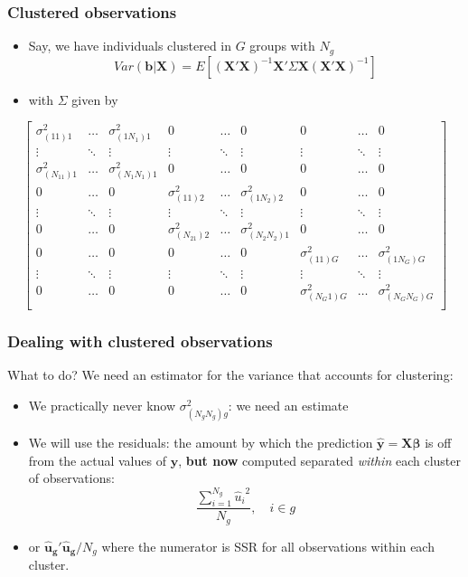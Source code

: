 \documentclass[xcolor=table,dvipsnames]{beamer}
\begin{document}
\begin{frame}
\frametitle{Clustered observations}
\begin{itemize}
\item Say, we have individuals clustered in $G$ groups with $N_g$ \pause
\[ Var(\mathbf{b}|\mathbf{X}) = E \left[(\mathbf{X}'\mathbf{X})^{-1}\mathbf{X}'\Sigma\mathbf{X}(\mathbf{X}'\mathbf{X})^{-1}\right]
\]
\item with $\Sigma$ given by
\end{itemize}
\footnotesize
\vspace{.3cm}
\[
\left[
\begin{array}{ccccccccc}
\sigma^2_{(11)1} & \ldots & \sigma^2_{(1N_1)1} & 0 & \ldots & 0 & 0 & \ldots & 0\\
\vdots & \ddots & \vdots & \vdots & \ddots & \vdots & \vdots & \ddots & \vdots\\
\sigma^2_{(N_11)1} & \ldots & \sigma^2_{(N_1N_1)1} & 0 & \ldots & 0 & 0 & \ldots & 0\\
0 & \ldots & 0 & \sigma^2_{(11)2} & \ldots & \sigma^2_{(1N_2)2} & 0 & \ldots & 0 \\
\vdots & \ddots & \vdots & \vdots & \ddots & \vdots & \vdots & \ddots & \vdots \\
0 & \ldots & 0 & \sigma^2_{(N_21)2} & \ldots & \sigma^2_{(N_2N_2)1} & 0 & \ldots & 0 \\
0 & \ldots & 0 & 0 & \ldots & 0 & \sigma^2_{(11)G} & \ldots & \sigma^2_{(1N_G)G} \\
\vdots & \ddots & \vdots & \vdots & \ddots & \vdots & \vdots & \ddots & \vdots \\
0 & \ldots & 0 & 0 & \ldots & 0 & \sigma^2_{(N_G1)G} & \ldots & \sigma^2_{(N_GN_G)G}\\
\end{array}
\right]
\]
\normalsize
\end{frame}

\begin{frame}
\frametitle{Dealing with clustered observations}
What to do? We need an estimator for the variance that accounts for clustering: 
\begin{itemize}
\item We practically never know $\sigma^2_{(N_gN_g)g}$: we need an estimate \pause
\item We will use the residuals: the amount by which the prediction $\mathbf{\hat{y}=X\beta}$ is off from the actual values of $\mathbf{y}$, \pause \textbf{but now} computed separated \textit{within} each cluster of observations: \pause
\begin{equation}
\frac{\sum\limits_{i=1}^{N_g}{\hat{u}_i}^2}{N_g}, \quad i\in g
\end{equation}
\pause
\item[] or $\mathbf{\hat{u}_g'\hat{u}_g}/N_g$ where the numerator is SSR for all observations within each cluster.
\end{itemize}
\end{frame}
\end{document}
